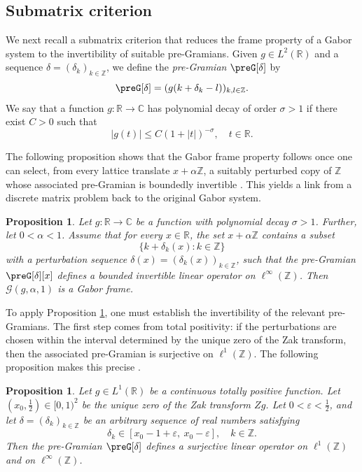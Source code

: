 \documentclass[reqno,a4paper,12pt]{amsart}
\numberwithin{equation}{section}
\newtheorem{proposition}[definition]{Proposition}
\def\Z{{\mathbb Z}}
\def\R{{\mathbb R}}
\def\C{{\mathbb C}}
\newcommand{\lt}{{L^2(\R)}}
\newcommand\1{\mathds{1}}
\newcommand{\cG}{\mathcal{G}}
\begin{document}
\subsection{Submatrix criterion}
We next recall a submatrix criterion that reduces the frame property of a Gabor system  to the invertibility of suitable pre-Gramians.
Given $g\in\lt$ and a sequence $\delta = (\delta_k)_{k\in\Z}$, we define the \emph{pre-Gramian} $\preG[\delta]$ by
\begin{equation}
        \preG[\delta] = (g(k+\delta_k-l))_{k,l\in\Z}.
    \end{equation}
We say that a function $g : \R \to \C$ has polynomial decay of order $\sigma>1$ if there exist $C > 0$ such that 
\begin{equation}\label{eq:polynomial_decay}
    |g(t)| \leq C (1+|t|)^{-\sigma}, \quad t \in \R.
\end{equation}

The following proposition shows that the Gabor frame property follows once one can select, from every lattice translate $x+\alpha\Z$, a suitably perturbed copy of $\Z$ whose associated pre-Gramian is boundedly invertible
\cite[Prop.~2.4]{Groechenig2023}. This yields a link from a discrete matrix problem back to the original Gabor system.

\begin{proposition}\label{prop:submatrix}
Let $g : \R \to \C$ be a function with polynomial decay $\sigma>1$. Further, let $0<\alpha<1$. Assume that for every
$x\in \R$, the set $x+\alpha\mathbb Z$ contains a subset
$$
\{k+\delta_k(x):k\in\mathbb Z\}
$$
with a perturbation sequence $\delta(x) = ( \delta_k(x))_{k \in \Z}$, such that the pre-Gramian $\preG[\delta][x]$ defines a bounded invertible linear operator on $\ell^\infty(\mathbb Z)$. Then
$\cG(g,\alpha,1)$ is a Gabor frame.
\end{proposition}

To apply Proposition \ref{prop:submatrix}, one must establish the invertibility of the relevant pre-Gramians. The first step comes from total positivity: if the perturbations are chosen within the interval determined by the unique zero of the Zak transform, then the associated pre-Gramian is surjective on $\ell^1(\Z)$. The following proposition makes this precise \cite[Prop.~3.1]{Groechenig2023}.

\begin{proposition}\label{prop:surjective}
Let $g \in L^1(\R)$ be a continuous totally positive function. Let
$(x_0,\frac12)\in[0,1)^2$ be the unique zero of the Zak transform
$Zg$. Let $0<\varepsilon<\frac12$, and let $\delta = (\delta_k) _{k
  \in \Z}$ be an arbitrary sequence of real numbers satisfying
$$
\delta_k\in [x_0-1+\varepsilon,\ x_0-\varepsilon],
\quad k\in \Z.
$$
Then the pre-Gramian $\preG[\delta]$ defines a surjective linear
operator on $\ell^1(\Z)$ and on $\ell ^\infty (\Z )$.
\end{proposition}
\end{document}
